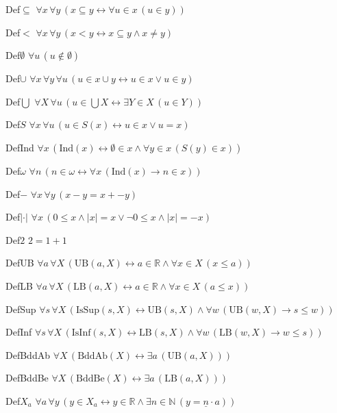 \begin{registrylist}
\item[Def$\subseteq$] $\forall x\,\forall y\,(x \subseteq y \leftrightarrow \forall u \in x\,(u \in y))$
\item[Def$<$] $\forall x\,\forall y\,(x < y \leftrightarrow x \subseteq y \land x \neq y)$
\item[Def$\emptyset$] $\forall u\,(u \notin \emptyset)$
\item[Def$\cup$] $\forall x\,\forall y\,\forall u\,(u \in x \cup y \leftrightarrow u \in x \lor u \in y)$
\item[Def$\bigcup$] $\forall X\,\forall u\,(u \in \textstyle\bigcup X \leftrightarrow \exists Y \in X\,(u \in Y))$
\item[Def$S$] $\forall x\,\forall u\,(u \in S(x) \leftrightarrow u \in x \lor u = x)$
\item[DefInd] $\forall x\,(\mathrm{Ind}(x) \leftrightarrow \emptyset \in x \land \forall y \in x\,(S(y) \in x))$
\item[Def$\omega$] $\forall n\,(n \in \omega \leftrightarrow \forall x\,(\mathrm{Ind}(x) \to n \in x))$
\item[Def$-$] $\forall x\,\forall y\,(x - y = x + -y)$
\item[Def$\lvert\cdot\rvert$] $\forall x\,(0 \leq x \land \lvert x \rvert = x \lor \neg 0 \leq x \land \lvert x \rvert = -x)$
\item[Def$2$] $2 = 1 + 1$
\item[DefUB] $\forall a\,\forall X\,(\mathrm{UB}(a,X) \leftrightarrow a \in \mathbb{R} \land \forall x \in X\,(x \leq a))$
\item[DefLB] $\forall a\,\forall X\,(\mathrm{LB}(a,X) \leftrightarrow a \in \mathbb{R} \land \forall x \in X\,(a \leq x))$
\item[DefSup] $\forall s\,\forall X\,(\mathrm{IsSup}(s,X) \leftrightarrow \mathrm{UB}(s,X) \land \forall w\,(\mathrm{UB}(w,X) \to s \leq w))$
\item[DefInf] $\forall s\,\forall X\,(\mathrm{IsInf}(s,X) \leftrightarrow \mathrm{LB}(s,X) \land \forall w\,(\mathrm{LB}(w,X) \to w \leq s))$
\item[DefBddAb] $\forall X\,(\mathrm{BddAb}(X) \leftrightarrow \exists a\,(\mathrm{UB}(a,X)))$
\item[DefBddBe] $\forall X\,(\mathrm{BddBe}(X) \leftrightarrow \exists a\,(\mathrm{LB}(a,X)))$
\item[Def$X_a$] $\forall a\,\forall y\,(y \in X_{a} \leftrightarrow y \in \mathbb{R} \land \exists n \in \mathbb{N}\,(y = \underline{n} \cdot a))$

\end{registrylist}

